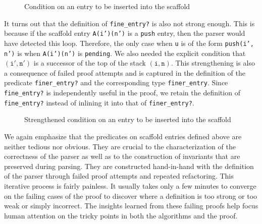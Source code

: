 \documentclass[sigplan,10pt,anonymous,review]{acmart}\settopmatter{printfolios=true,printccs=false,printacmref=false}
\begin{document}
\begin{CCSXML}
\begin{figure}[h!]
  
    \vspace*{-4mm}
\caption{\small Condition on an entry to be inserted into the scaffold}
\label{pvs:fineentry}
\end{figure}

It turns out that the definition of \texttt{fine\_entry?} is also not
strong enough.  This is because if the scaffold entry
\texttt{A(i')(n')} is a \texttt{push} entry, then the parser would
have detected this loop.  Therefore, the only case when \texttt{u} is
of the form \texttt{push(i', n')} is when \texttt{A(i')(n')} is
\texttt{pending}.  We also needed the explicit condition that
$(\mathtt{i', n'})$ is a successor of the top of the stack $(\mathtt{i,
  n})$\@.  This strengthening is also a consequence of failed proof
attempts and is captured in the definition of the predicate
\texttt{finer\_entry?} and the corresponding type \texttt{finer\_entry}\@.  Since
\texttt{fine\_entry?} is independently
useful in the proof, we retain the definition of \texttt{fine\_entry?}
instead of inlining it into that of \texttt{finer\_entry?}\@.  

\begin{figure}[h!]
  
    \vspace*{-4mm}
\caption{\small Strengthened condition on an entry to be inserted into the scaffold}
\label{pvs:finerentry}
\end{figure}

%   



We again emphasize that the predicates on scaffold entries defined
above are neither tedious nor obvious.  They are crucial to the
characterization of the correctness of the parser as well as to the
construction of invariants that are preserved during parsing.  They
are constructed hand-in-hand with the definition of the parser through
failed proof attempts and repeated refactoring.  This iterative
process is fairly painless.  It usually takes only a few minutes to
converge on the failing cases of the proof to discover where a
definition is too strong or too weak or simply incorrect.  The
insights learned from these failing proofs help focus human attention
on the tricky points in both the algorithms and the proof.


\end{CCSXML}
\end{document}
